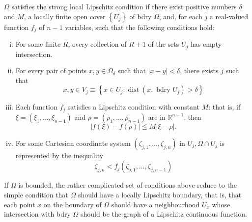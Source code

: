 \begin{para}
  $\Omega$ satisfies the strong local Lipschitz condition if there exist positive numbers $\delta$ and $M$, a locally finite open cover $\left\{U_j\right\}$ of bdry $\Omega$, and, for each $j$ a real-valued function $f_j$ of $n-1$ variables, such that the following conditions hold:
  
  \begin{enumerate}[(i)]
    \item For some finite $R$, every collection of $R+1$ of the sets $U_j$ has empty intersection.
    \item For every pair of points $x, y \in \Omega_\delta$ such that $|x-y|<\delta$,
      there exists $j$ such that
      \[
        x, y \in V_j \equiv\left\{x \in U_j: \operatorname{dist}\left(x, \text { bdry } U_j\right)>\delta\right\}
      \]
    \item Each function $f_j$ satisfies a Lipschitz condition with constant $M$:
      that is, if $\xi=\left(\xi_1, \ldots, \xi_{n-1}\right)$ and
      $\rho=\left(\rho_1, \ldots, \rho_{n-1}\right)$ are in $\mathbb{R}^{n-1}$, then
      \[|f(\xi)-f(\rho)| \leq M|\xi-\rho|.\]
    \item For some Cartesian coordinate system $\left(\zeta_{j, 1}, \ldots, \zeta_{j,n}\right)$
      in $U_j, \Omega \cap U_j$ is represented by the inequality
      \[
        \zeta_{j, n}<f_j\left(\zeta_{j, 1}, \ldots, \zeta_{j, n-1}\right)
      \]
  \end{enumerate}
  If $\Omega$ is bounded, the rather complicated set of conditions above reduce to the simple condition that $\Omega$ should have a locally Lipschitz boundary, that is, that each point $x$ on the boundary of $\Omega$ should have a neighbourhood $U_x$ whose intersection with bdry $\Omega$ should be the graph of a Lipschitz continuous function.
\end{para}


